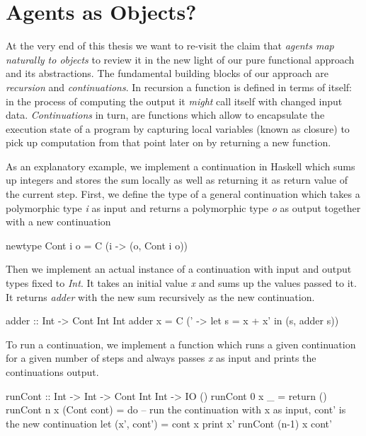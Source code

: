 \section{Agents as Objects?}
At the very end of this thesis we want to re-visit the claim that \textit{agents map naturally to objects} \cite{north_managing_2007} to review it in the new light of our pure functional approach and its abstractions. The fundamental building blocks of our approach are \textit{recursion} and \textit{continuations}. In recursion a function is defined in terms of itself: in the process of computing the output it \textit{might} call itself with changed input data. \textit{Continuations} in turn, are functions which allow to encapsulate the execution state of a program by capturing local variables (known as closure) to pick up computation from that point later on by returning a new function.

As an explanatory example, we implement a continuation in Haskell which sums up integers and stores the sum locally as well as returning it as return value of the current step. First, we define the type of a general continuation which takes a polymorphic type \textit{i} as input and returns a polymorphic type \textit{o} as output together with a new continuation

\begin{HaskellCode}
newtype Cont i o = C (i -> (o, Cont i o))
\end{HaskellCode}

Then we implement an actual instance of a continuation with input and output types fixed to \textit{Int}. It takes an initial value \textit{x} and sums up the values passed to it. It returns \textit{adder} with the new sum recursively as the new continuation.

\begin{HaskellCode}
adder :: Int -> Cont Int Int
adder x = C (\x' -> let s = x + x' in
                    (s, adder s))
\end{HaskellCode}

To run a continuation, we implement a function which runs a given continuation for a given number of steps and always passes \textit{x} as input and prints the continuations output.

\begin{HaskellCode}
runCont :: Int -> Int -> Cont Int Int -> IO ()
runCont 0 x _ = return () 
runCont n x (Cont cont) = do 
  -- run the continuation with x as input, cont' is the new continuation
  let (x', cont') = cont x
  print x'
  runCont (n-1) x cont' 
\end{HaskellCode}

